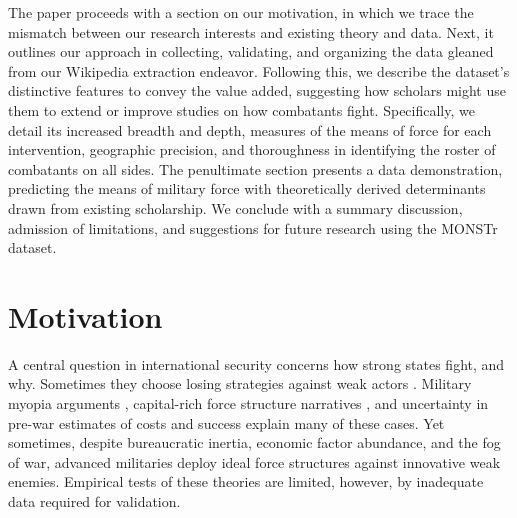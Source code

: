 \documentclass[fleqn,12pt]{article}
\begin{document}
The paper proceeds with a section on our motivation, in which we trace the mismatch between our research interests and existing theory and data. Next, it outlines our approach in collecting, validating, and organizing the data gleaned from our Wikipedia extraction endeavor. Following this, we describe the dataset's distinctive features to convey the value added, suggesting how scholars might use them to extend or improve studies on how combatants fight. Specifically, we detail its increased breadth and depth, measures of the means of force for each intervention, geographic precision, and thoroughness in identifying the roster of combatants on all sides. The penultimate section presents a data demonstration, predicting the means of military force with theoretically derived determinants drawn from existing scholarship. We conclude with a summary discussion, admission of limitations, and suggestions for future research using the MONSTr dataset.

\section*{Motivation}
A central question in international security concerns how strong states fight, and why. Sometimes they choose losing strategies against weak actors \citep{arreguin-toft_howweakwin_2001}. Military myopia arguments \citep{gentry_doomedfailamerica_2002, lyall_ragemachinesexplaining_2009}, capital-rich force structure narratives \citep{gartzke_democracypreparationwar_2001, caverley_mythmilitarymyopia_2009}, and uncertainty in pre-war estimates of costs and success \citep{sullivan_militaryinterventionpowerful_2009} explain many of these cases. Yet sometimes, despite bureaucratic inertia, economic factor abundance, and the fog of war, advanced militaries deploy ideal force structures against innovative weak enemies. Empirical tests of these theories are limited, however, by inadequate data required for validation. 
\end{document}
